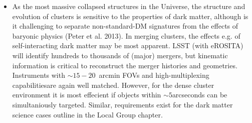 \begin{itemize}
\item As the most massive collapsed structures in the Universe, the structure
and evolution of clusters is sensitive to the properties of dark matter,
although is it challenging to separate non-standard-DM signatures from the
effects of baryonic physics (Peter et al. 2013). In merging clusters, the
effects e.g. of self-interacting dark matter may be most apparent.  LSST (with
eROSITA) will identify hundreds to thousands of (major) mergers, but kinematic
information is critical to reconstruct the merger histories and geometries.
Instruments with $\sim 15-20$~arcmin FOVs and high-multiplexing capabilitiesare
again well matched. However, for the dense cluster environment it is most
effecient if objects within $\sim5$arcseconds can be simultaniously targeted. Similar, requirements exist for the dark matter science cases outline in the Local Group chapter.
\end{itemize}

